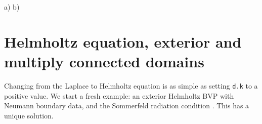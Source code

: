 \bfi %
a)
b)
\efi

\section{Helmholtz equation, exterior and multiply connected domains}
\label{s:ext}

Changing from the Laplace to Helmholtz equation is as simple
as setting {\tt d.k} to a positive value.
We start a fresh example: an exterior Helmholtz BVP
with Neumann boundary data, and the Sommerfeld radiation
condition \cite{coltonkress}. This has a unique solution.

